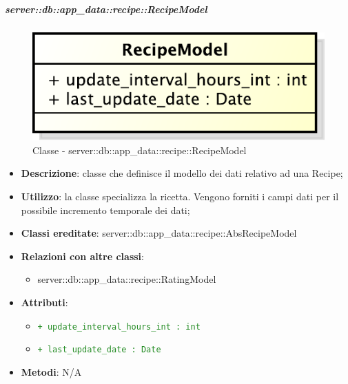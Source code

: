 		\subparagraph{server::db::app\_data::recipe::RecipeModel} %
		\label{subp:server_db_app_data_recipe_recipemodel}
			\begin{figure}[htbp]
				\centering
				\centerline{\includegraphics[scale=0.75]{./images/server/classes/db/recipe_model.pdf}}
				\caption{Classe - server::db::app\_data::recipe::RecipeModel}
			\end{figure}
			\begin{itemize}
				\item \textbf{Descrizione}: classe che definisce il modello dei dati relativo ad una Recipe;
				\item \textbf{Utilizzo}: la classe specializza la ricetta. Vengono forniti i campi dati per il possibile incremento temporale dei dati;
				\item \textbf{Classi ereditate}: server::db::app\_data::recipe::AbsRecipeModel
				\item \textbf{Relazioni con altre classi}:
					\begin{itemize}
						\item server::db::app\_data::recipe::RatingModel
					\end{itemize}
				\item \textbf{Attributi}:
					\begin{itemize}
						\item \textcolor{forestgreen}{\texttt{+ update\_interval\_hours\_int : int}}
						\item \textcolor{forestgreen}{\texttt{+ last\_update\_date : Date}}
					\end{itemize}
				\item \textbf{Metodi}: N/A
			\end{itemize}

